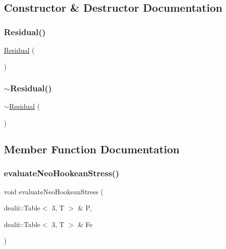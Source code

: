 \subsection{Constructor \& Destructor Documentation}
\mbox{\label{class_residual_a4b540ba8e3ad0a1f8cfe2b4acd20493b}} 
\subsubsection{\texorpdfstring{Residual()}{Residual()}}
{\footnotesize\ttfamily \mbox{\hyperlink{class_residual}{Residual}} (\begin{DoxyParamCaption}{ }\end{DoxyParamCaption})}

\mbox{\label{class_residual_a8eef8c757003dd763b7dddc733f65641}} 
\subsubsection{\texorpdfstring{$\sim$\+Residual()}{~Residual()}}
{\footnotesize\ttfamily $\sim$\mbox{\hyperlink{class_residual}{Residual}} (\begin{DoxyParamCaption}{ }\end{DoxyParamCaption})}



\subsection{Member Function Documentation}
\mbox{\label{class_residual_a0f9ff6a237d377803ce368b26ca39652}} 
\subsubsection{\texorpdfstring{evaluate\+Neo\+Hookean\+Stress()}{evaluateNeoHookeanStress()}}
{\footnotesize\ttfamily void evaluate\+Neo\+Hookean\+Stress (\begin{DoxyParamCaption}\item[{dealii\+::\+Table$<$ 3, T $>$ \&}]{P,  }\item[{dealii\+::\+Table$<$ 3, T $>$ \&}]{Fe }\end{DoxyParamCaption})}

